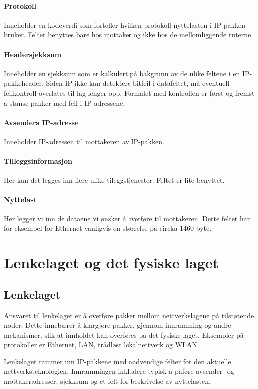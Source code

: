 \documentclass[11pt,a4paper]{article}
\begin{document}
\paragraph{Protokoll} Inneholder en kodeverdi som forteller hvilken protokoll nyttelasten i IP-pakken bruker. Feltet benyttes bare hos mottaker og ikke hos de mellomliggende ruterne.
\paragraph{Headersjekksum} Inneholder en sjekksum som er kalkulert på bakgrunn av de ulike feltene i en IP-pakkeheader. Siden IP ikke kan detektere bitfeil i datafeltet, må eventuell feilkontroll overlates til lag lenger opp. Formålet med kontrollen er først og fremst å stanse pakker med feil i IP-adressene. 
\paragraph{Avsenders IP-adresse} Inneholder IP-adressen til mottakeren av IP-pakken.
\paragraph{Tilleggsinformasjon} Her kan det legges inn flere ulike tileggstjenester. Feltet er lite benyttet.
\paragraph{Nyttelast} Her legger vi inn de dataene vi ønsker å overføre til mottakeren. Dette feltet har for eksempel for Ethernet vanligvis en størrelse på circka 1460 byte.

\section{Lenkelaget og det fysiske laget}
\subsection{Lenkelaget}
Ansvaret til lenkelaget er å overføre pakker mellom nettverkslagene på tilstøtende noder. Dette innebærer å klargjøre pakker, gjennom innramming og andre mekanismer, slik at innholdet kan overføres på det fysiske laget. Eksempler på protokoller er Ethernet, LAN, trådløst lokalnettverk og WLAN. 

Lenkelaget rammer inn IP-pakkene med nødvendige felter for den aktuelle nettverksteknologien. Innrammingen inkludere typisk å påføre avsender- og mottakeradresser, sjekksum og et felt for beskrivelse av nyttelasten.
\end{document}
